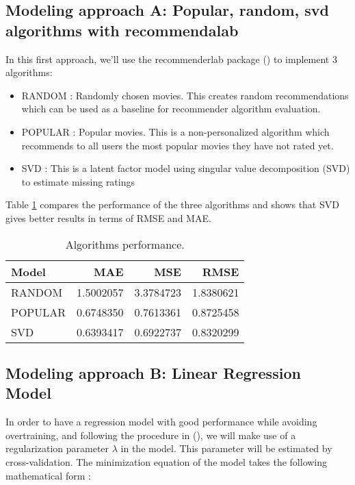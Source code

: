 \documentclass[
]{article}
\begin{document}
\subsection{Modeling approach A: Popular, random, svd algorithms with recommendalab}\label{modeling-approach-a-popular-random-svd-algorithms-with-recommendalab}

In this first approach, we'll use the recommenderlab package () to implement 3 algorithms:

\begin{itemize}
\item
  RANDOM : Randomly chosen movies. This creates random recommendations which can
  be used as a baseline for recommender algorithm evaluation.
\item
  POPULAR : Popular movies. This is a non-personalized algorithm which recommends to
  all users the most popular movies they have not rated yet.
\item
  SVD : This is a latent factor model using singular value decomposition (SVD) to estimate missing
  ratings
\end{itemize}

Table \ref{tab:modelA} compares the performance of the three algorithms and shows that SVD gives better results in terms of RMSE and MAE.

\begin{table}[H]
\centering
\caption{\label{tab:modelA}Algorithms performance.}
\centering
\begin{tabular}[t]{lrrr}
\toprule
Model & MAE & MSE & RMSE\\
\midrule
RANDOM & 1.5002057 & 3.3784723 & 1.8380621\\
POPULAR & 0.6748350 & 0.7613361 & 0.8725458\\
SVD & 0.6393417 & 0.6922737 & 0.8320299\\
\bottomrule
\end{tabular}
\end{table}

\subsection{Modeling approach B: Linear Regression Model}\label{modeling-approach-b-linear-regression-model}

In order to have a regression model with good performance while avoiding overtraining, and following the procedure in (), we will make use of a regularization parameter \(\lambda\) in the model. This parameter will be estimated by cross-validation. The minimization equation of the model takes the following mathematical form :
\end{document}
